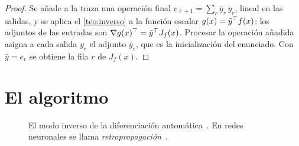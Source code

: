 \begin{proof}
Se añade a la traza una operación final $v_{\ell+1}=\sum_{r}\bar y_r\,y_r$, lineal en las salidas, y se aplica el \cref{teo:inverso} a la función escalar $g(x)=\bar y^{\top} f(x)$: los adjuntos de las entradas son $\nabla g(x)^{\top}=\bar y^{\top} J_f(x)$. Procesar la operación añadida asigna a cada salida $y_r$ el adjunto $\bar y_r$, que es la inicialización del enunciado. Con $\bar y=e_r$ se obtiene la fila $r$ de $J_f(x)$.
\end{proof}

\section{El algoritmo}

\begin{figure}[h]
\centering
{}
\caption{El modo inverso de la diferenciación automática~\cite[§3.2]{baydin}. En redes neuronales se llama \emph{retropropagación}~\cite[§6.5.6]{gbc}.}
\label{fig:algoritmo}
\end{figure}

